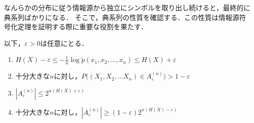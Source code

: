 \documentclass{classes/myclass}
\begin{document}
なんらかの分布に従う情報源から独立にシンボルを取り出し続けると，最終的に典系列ばかりになる．
そこで，典系列の性質を確認する．この性質は情報源符号化定理を証明する際に重要な役割を果たす．

\begin{thm}[典系列の性質]
以下，$\varepsilon > 0$は任意にとる．
\begin{enumerate}
  \item $H(X) - \varepsilon \leq -\frac{1}{n} \log \tilde{p}(x_1, x_2, ..., x_n) \leq H(X) + \varepsilon$ \label{property:typical-set1}
  \item 十分大きな$n$に対し，$P\lparen (X_1, X_2, ... X_n) \in A_{\varepsilon}^{(n)} \rparen > 1 - \varepsilon$ \label{property:typical-set2}
  \item $|A_{\varepsilon}^{(n)}| \leq 2^{n(H(X) + \varepsilon)}$ \label{property:typical-set3}
  \item 十分大きな$n$に対し，$|A_{\varepsilon}^{(n)}| \geq (1 - \varepsilon)2^{n(H(X) - \varepsilon)}$ \label{property:typical-set4}
\end{enumerate}
\end{thm}
\end{document}
